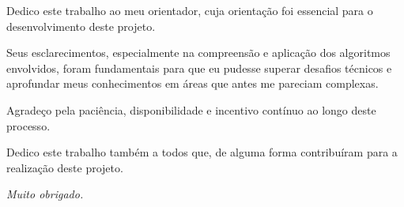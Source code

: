 \documentclass[	12pt, Times, openright, twoside, a4paper, english, brazil]{abntex2}
\begin{document}
%
% 
%
\begin{folhadeaprovacao}
	\begin{center}
		{\ABNTEXchapterfont\large\imprimirautor}

		\vspace*{\fill}\vspace*{\fill}
		{\ABNTEXchapterfont\bfseries\Large\imprimirtitulo}
		\vspace*{\fill}
		
		\hspace{.45\textwidth}
		\begin{minipage}{.5\textwidth}
			\imprimirpreambulo
		\end{minipage}%
		\vspace*{\fill}
	\end{center}
	

		
	\begin{center}
		\vspace*{0.5cm}
		{\large\imprimirlocal}
		\par
		{\large\imprimirdata}
		\vspace*{1cm}
	\end{center}
\end{folhadeaprovacao}

\begin{dedicatoria}
	\vspace*{\fill}
	\centering
	\noindent
	Dedico este trabalho ao meu orientador, cuja orientação foi essencial para o desenvolvimento deste projeto. 

	Seus esclarecimentos, especialmente na compreensão e aplicação dos algoritmos envolvidos, foram fundamentais para que eu pudesse superar desafios técnicos e aprofundar meus conhecimentos em áreas que antes me pareciam complexas.

	Agradeço pela paciência, disponibilidade e incentivo contínuo ao longo deste processo.

	Dedico este trabalho também a todos que, de alguma forma contribuíram para a realização deste projeto.
	
	\textit{Muito obrigado.}
	
	\vspace*{\fill}
\end{dedicatoria}
\end{document}
